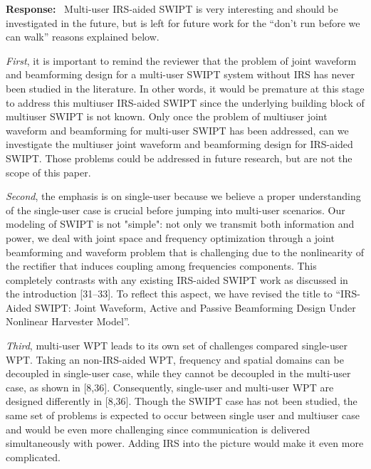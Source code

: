 \documentclass{article}
\newcounter{reviewer}
\newcounter{response}[reviewer]
\newenvironment{response}
	{\refstepcounter{response} \medskip \noindent \textbf{Response:}\ }
	{\medskip}
\begin{document}
\begin{reviewer}
		\begin{response}
			Multi-user IRS-aided SWIPT is very interesting and should be investigated in the future, but is left for future work for the ``don't run before we can walk'' reasons explained below.

			\emph{First}, it is important to remind the reviewer that the problem of joint waveform and beamforming design for a multi-user SWIPT system without IRS has never been studied in the literature. In other words, it would be premature at this stage to address this multiuser IRS-aided SWIPT since the underlying building block of multiuser SWIPT is not known. Only once the problem of multiuser joint waveform and beamforming for multi-user SWIPT has been addressed, can we investigate the multiuser joint waveform and beamforming design for IRS-aided SWIPT. Those problems could be addressed in future research, but are not the scope of this paper.

			\emph{Second}, the emphasis is on single-user because we believe a proper understanding of the single-user case is crucial before jumping into multi-user scenarios. Our modeling of SWIPT is not "simple": not only we transmit both information and power, we deal with joint space and frequency optimization through a joint beamforming and waveform problem that is challenging due to the nonlinearity of the rectifier that induces coupling among frequencies components. This completely contrasts with any existing IRS-aided SWIPT work as discussed in the introduction [31--33]. To reflect this aspect, we have revised the title to ``IRS-Aided SWIPT: Joint Waveform, Active and Passive Beamforming Design Under Nonlinear Harvester Model''.

			\emph{Third}, multi-user WPT leads to its own set of challenges compared single-user WPT. Taking an non-IRS-aided WPT, frequency and spatial domains can be decoupled in single-user case, while they cannot be decoupled in the multi-user case, as shown in [8,36]. Consequently, single-user and multi-user WPT are designed differently in [8,36]. Though the SWIPT case has not been studied, the same set of problems is expected to occur between single user and multiuser case and would be even more challenging since communication is delivered simultaneously with power. Adding IRS into the picture would make it even more complicated.
			\label{re:1.2}
		\end{response}


\end{reviewer}
\end{document}
